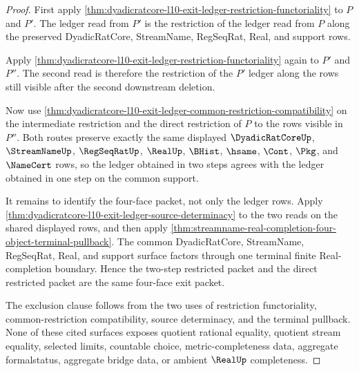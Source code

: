 \begin{proof}
First apply \autoref{thm:dyadicratcore-l10-exit-ledger-restriction-functoriality} to $P$ and $P'$. The ledger read from $P'$ is the restriction of the ledger read from $P$ along the preserved DyadicRatCore, StreamName, RegSeqRat, Real, and support rows.

Apply \autoref{thm:dyadicratcore-l10-exit-ledger-restriction-functoriality} again to $P'$ and $P''$. The second read is therefore the restriction of the $P'$ ledger along the rows still visible after the second downstream deletion.

Now use \autoref{thm:dyadicratcore-l10-exit-ledger-common-restriction-compatibility} on the intermediate restriction and the direct restriction of $P$ to the rows visible in $P''$. Both routes preserve exactly the same displayed $\DyadicRatCoreUp$, $\StreamNameUp$, $\RegSeqRatUp$, $\RealUp$, $\BHist$, $\hsame$, $\Cont$, $\Pkg$, and $\NameCert$ rows, so the ledger obtained in two steps agrees with the ledger obtained in one step on the common support.

It remains to identify the four-face packet, not only the ledger rows. Apply \autoref{thm:dyadicratcore-l10-exit-ledger-source-determinacy} to the two reads on the shared displayed rows, and then apply \autoref{thm:streamname-real-completion-four-object-terminal-pullback}. The common DyadicRatCore, StreamName, RegSeqRat, Real, and support surface factors through one terminal finite Real-completion boundary. Hence the two-step restricted packet and the direct restricted packet are the same four-face exit packet.

The exclusion clause follows from the two uses of restriction functoriality, common-restriction compatibility, source determinacy, and the terminal pullback. None of these cited surfaces exposes quotient rational equality, quotient stream equality, selected limits, countable choice, metric-completeness data, aggregate formalstatus, aggregate bridge data, or ambient $\RealUp$ completeness.
\end{proof}

